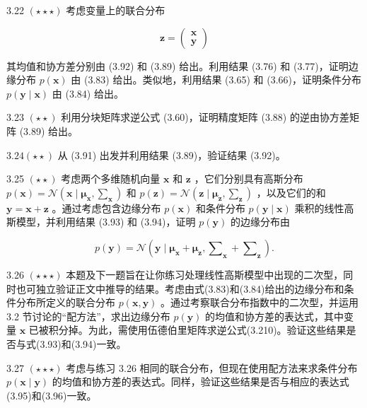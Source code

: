 \documentclass[10pt]{article}
\begin{document}
3.22 \(\left( {\star  \star   \star  }\right)\) 考虑变量上的联合分布

\[
\mathbf{z} = \left( \begin{array}{l} \mathbf{x} \\  \mathbf{y} \end{array}\right)  \tag{3.211}
\]

其均值和协方差分别由 (3.92) 和 (3.89) 给出。利用结果 (3.76) 和 (3.77)，证明边缘分布 \(p\left( \mathbf{x}\right)\) 由 (3.83) 给出。类似地，利用结果 (3.65) 和 (3.66)，证明条件分布 \(p\left( {\mathbf{y} \mid  \mathbf{x}}\right)\) 由 (3.84) 给出。

3.23 \(\left( {\star  \star  }\right)\) 利用分块矩阵求逆公式 (3.60)，证明精度矩阵 (3.88) 的逆由协方差矩阵 (3.89) 给出。

\({3.24}\left( {\star  \star  }\right)\) 从 (3.91) 出发并利用结果 (3.89)，验证结果 (3.92)。

3.25 \(\left( {\star  \star  }\right)\) 考虑两个多维随机向量 \(\mathbf{x}\) 和 \(\mathbf{z}\) ，它们分别具有高斯分布 \(p\left( \mathbf{x}\right)  = \mathcal{N}\left( {\mathbf{x} \mid  {\mathbf{\mu }}_{\mathbf{x}},{\mathbf{\sum }}_{\mathbf{x}}}\right)\) 和 \(p\left( \mathbf{z}\right)  = \mathcal{N}\left( {\mathbf{z} \mid  {\mathbf{\mu }}_{\mathbf{z}},{\mathbf{\sum }}_{\mathbf{z}}}\right)\) ，以及它们的和 \(\mathbf{y} = \mathbf{x} + \mathbf{z}\) 。通过考虑包含边缘分布 \(p\left( \mathbf{x}\right)\) 和条件分布 \(p\left( {\mathbf{y} \mid  \mathbf{x}}\right)\) 乘积的线性高斯模型，并利用结果 (3.93) 和 (3.94)，证明 \(p\left( \mathbf{y}\right)\) 的边缘分布由

\[
p\left( \mathbf{y}\right)  = \mathcal{N}\left( {\mathbf{y} \mid  {\mathbf{\mu }}_{\mathbf{x}} + {\mathbf{\mu }}_{\mathbf{z}},{\mathbf{\sum }}_{\mathbf{x}} + {\mathbf{\sum }}_{\mathbf{z}}}\right) . \tag{3.212}
\]

3.26 \(\left( {\star  \star   \star  }\right)\) 本题及下一题旨在让你练习处理线性高斯模型中出现的二次型，同时也可独立验证正文中推导的结果。考虑由式(3.83)和(3.84)给出的边缘分布和条件分布所定义的联合分布 \(p\left( {\mathbf{x},\mathbf{y}}\right)\) 。通过考察联合分布指数中的二次型，并运用 3.2 节讨论的“配方法”，求出边缘分布 \(p\left( \mathbf{y}\right)\) 的均值和协方差的表达式，其中变量 \(\mathbf{x}\) 已被积分掉。为此，需使用伍德伯里矩阵求逆公式(3.210)。验证这些结果是否与式(3.93)和(3.94)一致。

3.27 \(\left( {\star  \star   \star  }\right)\) 考虑与练习 3.26 相同的联合分布，但现在使用配方法来求条件分布 \(p\left( {\mathbf{x} \mid  \mathbf{y}}\right)\) 的均值和协方差的表达式。同样，验证这些结果是否与相应的表达式(3.95)和(3.96)一致。
\end{document}
